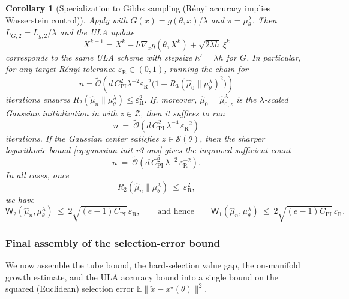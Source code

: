 \documentclass{article}
\theoremstyle{normaltheorem}
\newtheorem{corr}[corr]{Corollary}
\newcommand{\gibbs}{\mu}
\newcommand{\calS}{\mathcal{S}}
\begin{document}
\begin{corr}[Specialization to Gibbs sampling (R\'enyi accuracy implies Wasserstein control)]\label{cor:lmc-gibbs-w2}
Apply  with $G(x)=g(\theta,x)/\lambda$ and $\pi=\gibbs_\theta^\lambda$.
Then $L_{G,2}=L_{g,2}/\lambda$ and the ULA update
\[
X^{k+1}=X^{k}-h\nabla_x g(\theta,X^{k})+\sqrt{2\lambda h}\,\xi^{k}
\]
corresponds to the same ULA scheme with stepsize $h' = \lambda h$ for $G$.
In particular, for any target R\'enyi tolerance $\varepsilon_{\mathrm R}\in(0,1)$, running the chain for
\[
n
=
\widetilde{\mathcal{O}}\!\left(
d\,C_{\mathrm{PI}}^{2}\lambda^{-2}\varepsilon_{\mathrm R}^{-2}
\bigl(1+R_3(\widehat\mu_0\|\gibbs_\theta^\lambda)^2\bigr)
\right)
\]
iterations ensures \(R_2(\widehat\mu_n\|\gibbs_\theta^\lambda)\le \varepsilon_{\mathrm R}^{2}\).
If, moreover, \(\widehat\mu_0=\widehat\mu_{0,z}^{\lambda}\) is the \(\lambda\)-scaled Gaussian initialization in
 with \(z\in\mathcal Z\), then it suffices to run
\begin{equation}\label{eq:lmc-n-final}
n\ =\ \widetilde{\mathcal{O}}\!\left(d\,C_{\mathrm{PI}}^{2}\,\lambda^{-4}\,\varepsilon_{\mathrm R}^{-2}\right)
\end{equation}
iterations. If the Gaussian center satisfies \(z\in\calS(\theta)\), then the sharper logarithmic bound
\eqref{eq:gaussian-init-r3-ons} gives the improved sufficient count
\[
n\ =\ \widetilde{\mathcal{O}}\!\left(d\,C_{\mathrm{PI}}^{2}\,\lambda^{-2}\,\varepsilon_{\mathrm R}^{-2}\right).
\]
In all cases, once
\[
R_2(\widehat\mu_n\|\gibbs_\theta^\lambda)\ \le\ \varepsilon_{\mathrm R}^{2},
\]
we have
\[
\mathsf W_2(\widehat\mu_n,\gibbs_\theta^\lambda)
\ \le\
2\sqrt{(e-1)C_{\mathrm{PI}}}\,\varepsilon_{\mathrm R},
\qquad\text{and hence}\qquad
\mathsf W_1(\widehat\mu_n,\gibbs_\theta^\lambda)
\ \le\
2\sqrt{(e-1)C_{\mathrm{PI}}}\,\varepsilon_{\mathrm R}.
\]
\end{corr}


\subsubsection{Final assembly of the selection-error bound}
We now assemble the tube bound, the hard-selection value gap, the on-manifold growth estimate, and the ULA accuracy bound into a single bound on the squared (Euclidean) selection error
$\mathbb E\|\tilde x-x^\star(\theta)\|^2$.
\end{document}
